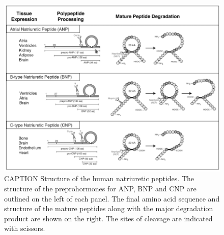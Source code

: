 \documentclass[14pt,a4paper,onecolumn]{extarticle}
\begin{document}


\begin{figure}      \centering      \includegraphics[scale=0.4]{../../images/NP_structure.png}      \caption{CAPTION Structure of the human natriuretic peptides. The structure of the preprohormones for ANP, BNP and CNP are outlined on the left of each panel. The final amino acid sequence and structure of the mature peptides along with the major degradation product are shown on the right. The sites of cleavage are indicated with scissors.}      \label{NP_structure}  \end{figure}

\end{document}
